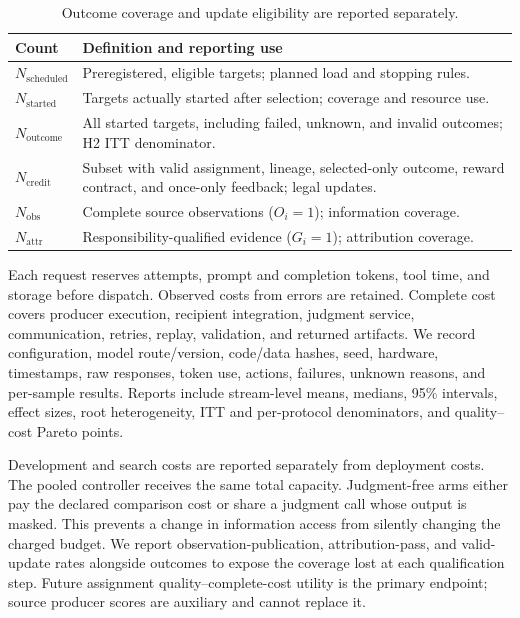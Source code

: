 \documentclass[sigconf,anonymous]{aamas}
\begin{document}
\begin{table}[t]
\centering\small
\begin{tabular}{@{}p{}p{}@{}}
\toprule
Count & Definition and reporting use \\
\midrule
$N_{\mathrm{scheduled}}$ & Preregistered, eligible targets; planned load and stopping rules. \\
$N_{\mathrm{started}}$ & Targets actually started after selection; coverage and resource use. \\
$N_{\mathrm{outcome}}$ & All started targets, including failed, unknown, and invalid outcomes; H2 ITT denominator. \\
$N_{\mathrm{credit}}$ & Subset with valid assignment, lineage, selected-only outcome, reward contract, and once-only feedback; legal updates. \\
$N_{\mathrm{obs}}$ & Complete source observations ($O_i=1$); information coverage. \\
$N_{\mathrm{attr}}$ & Responsibility-qualified evidence ($G_i=1$); attribution coverage. \\
\bottomrule
\end{tabular}
\caption{Outcome coverage and update eligibility are reported separately.}
\label{tab:denominators}
\end{table}

Each request reserves attempts, prompt and completion tokens, tool time, and storage before dispatch. Observed costs from errors are retained. Complete cost covers producer execution, recipient integration, judgment service, communication, retries, replay, validation, and returned artifacts. We record configuration, model route/version, code/data hashes, seed, hardware, timestamps, raw responses, token use, actions, failures, unknown reasons, and per-sample results. Reports include stream-level means, medians, 95\% intervals, effect sizes, root heterogeneity, ITT and per-protocol denominators, and quality--cost Pareto points.

Development and search costs are reported separately from deployment costs. The pooled controller receives the same total capacity. Judgment-free arms either pay the declared comparison cost or share a judgment call whose output is masked. This prevents a change in information access from silently changing the charged budget. We report observation-publication, attribution-pass, and valid-update rates alongside outcomes to expose the coverage lost at each qualification step. Future assignment quality--complete-cost utility is the primary endpoint; source producer scores are auxiliary and cannot replace it.
\end{document}
